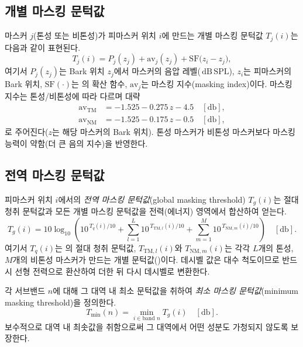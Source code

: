 \documentclass[11pt,a4paper]{article}
\newcommand{\dBSPL}{\ensuremath{\,\mathrm{dB\,SPL}}}  %
\newcommand{\ATH}{T_{q}}                               %
\begin{document}
\subsection{개별 마스킹 문턱값}
마스커 $j$(톤성 또는 비톤성)가 피마스커 위치 $i$에 만드는 개별 마스킹 문턱값
$T_{j}(i)$는 다음과 같이 표현된다.
\begin{equation}\label{eq:indiv}
  T_{j}(i) = P_{j}(z_{j}) + \mathrm{av}_{j}(z_{j}) + \mathrm{SF}\bigl(z_{i}-z_{j}\bigr),
\end{equation}
여기서 $P_{j}(z_{j})$는 Bark 위치 $z_{j}$에서 마스커의 음압 레벨(\dBSPL),
$z_{i}$는 피마스커의 Bark 위치, $\mathrm{SF}(\cdot)$는 의 확산 함수,
$\mathrm{av}_{j}$는 마스킹 지수(masking index)이다. 마스킹 지수는 톤성/비톤성에 따라
다르며 대략
\begin{align}
  \mathrm{av}_{\mathrm{TM}} &= -1.525 - 0.275\,z - 4.5 \quad [\si{\decibel}], \label{eq:avtm}\\
  \mathrm{av}_{\mathrm{NM}} &= -1.525 - 0.175\,z - 0.5 \quad [\si{\decibel}], \label{eq:avnm}
\end{align}
로 주어진다($z$는 해당 마스커의 Bark 위치). 톤성 마스커가 비톤성 마스커보다 마스킹
능력이 약함(더 큰 음의 지수)을 반영한다.

\subsection{전역 마스킹 문턱값}
피마스커 위치 $i$에서의 \emph{전역 마스킹 문턱값}(global masking threshold)
$T_{g}(i)$는 절대 청취 문턱값과 모든 개별 마스킹 문턱값을 전력(에너지) 영역에서
합산하여 얻는다.
\begin{equation}\label{eq:global}
  T_{g}(i) = 10\log_{10}\!\left(
     10^{\,\ATH(i)/10}
     + \sum_{l=1}^{L} 10^{\,T_{\mathrm{TM},l}(i)/10}
     + \sum_{m=1}^{M} 10^{\,T_{\mathrm{NM},m}(i)/10}
  \right) \quad [\si{\decibel}].
\end{equation}
여기서 $\ATH(i)$는 의 절대 청취 문턱값, $T_{\mathrm{TM},l}(i)$와
$T_{\mathrm{NM},m}(i)$는 각각 $L$개의 톤성, $M$개의 비톤성 마스커가 만드는 개별
문턱값()이다. 데시벨 값은 대수 척도이므로 반드시 선형 전력으로
환산하여 더한 뒤 다시 데시벨로 변환한다.

각 서브밴드 $n$에 대해 그 대역 내 최소 문턱값을 취하여
\emph{최소 마스킹 문턱값}(minimum masking threshold)을 정의한다.
\begin{equation}\label{eq:minmask}
  T_{\min}(n) = \min_{i \in \text{band } n} T_{g}(i) \quad [\si{\decibel}].
\end{equation}
보수적으로 대역 내 최솟값을 취함으로써 그 대역에서 어떤 성분도 가청되지 않도록
보장한다.
\end{document}
